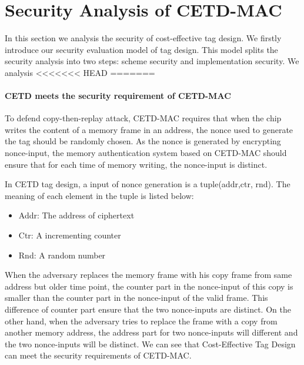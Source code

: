 
%
\section{Security Analysis of CETD-MAC}
In this section we analysis the security of cost-effective tag design. We firstly introduce our security evaluation model of tag design. This model splits the security analysis into two steps: scheme security and implementation security. We analysis 
<<<<<<< HEAD
=======
\paragraph{CETD meets the security requirement of CETD-MAC}
To defend copy-then-replay attack, CETD-MAC requires that when the chip writes
the content of a memory frame in an address, the nonce used to generate the tag
should be randomly chosen. As the nonce is generated by encrypting nonce-input,
the memory authentication system based on CETD-MAC should ensure that for each
time of memory writing, the nonce-input is distinct.

In CETD tag design, a input of nonce generation is a tuple(addr,ctr, rnd). The meaning of each element in the tuple is listed below: 
\begin{itemize}
	\item Addr: The address of ciphertext
	\item Ctr: A incrementing counter 
	\item Rnd: A random number
\end{itemize}
When the adversary replaces the memory frame with his copy frame from same
address but older time point, the counter part in the nonce-input of this copy
is smaller than the counter part in the nonce-input of the valid frame. This
difference of counter part ensure that the two nonce-inputs are distinct. 
On the other hand, when the adversary tries to replace the frame with a copy
from another memory address, the address part for two nonce-inputs will
different and the two nonce-inputs will be distinct.
We can see that Cost-Effective Tag Design can meet the security requirements of
CETD-MAC.

